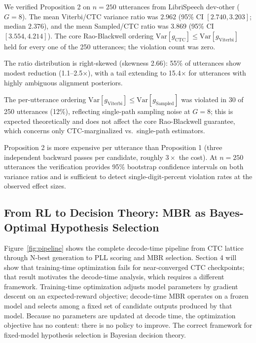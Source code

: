 We verified Proposition 2 on $n = 250$ utterances from LibriSpeech dev-other ($G=8$). The mean Viterbi/CTC variance ratio was $2.962$ (95\% CI $[2.740, 3.203]$; median $2.376$), and the mean Sampled/CTC ratio was $3.869$ (95\% CI $[3.554, 4.214]$). The core Rao-Blackwell ordering $\text{Var}[g_\text{CTC}] \leq \text{Var}[g_\text{Viterbi}]$ held for every one of the 250 utterances; the violation count was zero.

The ratio distribution is right-skewed (skewness 2.66): 55\% of utterances show modest reduction (1.1--2.5$\times$), with a tail extending to 15.4$\times$ for utterances with highly ambiguous alignment posteriors.

The per-utterance ordering $\text{Var}[g_\text{Viterbi}] \leq \text{Var}[g_\text{Sampled}]$ was violated in 30 of 250 utterances (12\%), reflecting single-path sampling noise at $G=8$; this is expected theoretically and does not affect the core Rao-Blackwell guarantee, which concerns only CTC-marginalized vs.\ single-path estimators.

Proposition 2 is more expensive per utterance than Proposition 1 (three independent backward passes per candidate, roughly $3\times$ the cost). At $n = 250$ utterances the verification provides 95\% bootstrap confidence intervals on both variance ratios and is sufficient to detect single-digit-percent violation rates at the observed effect sizes.



\subsection{From RL to Decision Theory: MBR as Bayes-Optimal Hypothesis Selection}

Figure~\ref{fig:pipeline} shows the complete decode-time pipeline from CTC lattice through N-best generation to PLL scoring and MBR selection. Section 4 will show that training-time optimization fails for near-converged CTC checkpoints; that result motivates the decode-time analysis, which requires a different framework. Training-time optimization adjusts model parameters by gradient descent on an expected-reward objective; decode-time MBR operates on a frozen model and selects among a fixed set of candidate outputs produced by that model. Because no parameters are updated at decode time, the optimization objective has no content: there is no policy to improve. The correct framework for fixed-model hypothesis selection is Bayesian decision theory.

